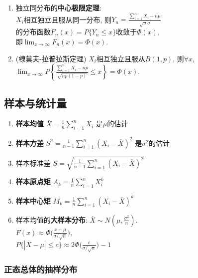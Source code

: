 \documentclass[10pt,a4paper,nofonts]{ctexart}
\newcommand{\D}{\displaystyle}
\begin{document}
\begin{multicols}{2}
\begin{enumerate}
\item 独立同分布的{\bf 中心极限定理}: \\$X_i$相互独立且服从同一分布, 则$Y_n=\D\frac{\sum_{i=1}^{n}X_i-n\mu}{\sqrt{n}{\sigma}}$\\的分布函数$F_n(x)=P\{Y_n\le x\}$收敛于$\varPhi(x)$,\\ 即$\lim_{x\to\infty}F_n(x)=\varPhi(x).$

\item (棣莫夫-拉普拉斯定理) $X_i$相互独立且服从$B(1,p)$, 则$\forall x$, $\D\lim_{x\to\infty}P\left\{\frac{\sum_{i=1}^{n}X_i-np}{\sqrt{np(1-p)}}\le x\right\}=\varPhi(x).$

\end{enumerate}

\subsection{样本与统计量}

\begin{enumerate}
\item {\bf 样本均值} $\overline{X}=\frac{1}{n}\sum_{i=1}^{n}X_i$ 是$\mu$的估计
\item {\bf 样本方差} $S^2=\frac{1}{n-1}\sum_{i=1}^{n}(X_i-\overline{X})^2$ 是$\sigma^2$的估计
\item 样本标准差 $S=\sqrt{\frac{1}{n-1}\sum_{i=1}^{n}(X_i-\overline{X})^2}$
\item {\bf 样本原点矩} $A_k=\frac{1}{n}\sum_{i=1}^{n}X_i^k$
\item {\bf 样本中心矩} $M_k=\frac{1}{n}\sum_{i=1}^{n}(X_i-\overline{X})^k$
\item 样本均值的{\bf 大样本分布}: $\D\overline{X}\sim N(\mu,\frac{\sigma^2}{n})$.\\
$\D F(x)\approx\varPhi\Big(\frac{x-\mu}{\sigma/\sqrt{n}}\Big)$,\\
$\D P\{|\overline{X}-\mu|\le c\}\approx 2\varPhi\Big(\frac{c}{\sigma/\sqrt{n}}\Big)-1$

\end{enumerate}

\subsubsection*{正态总体的抽样分布}


\end{multicols}
\end{document}
